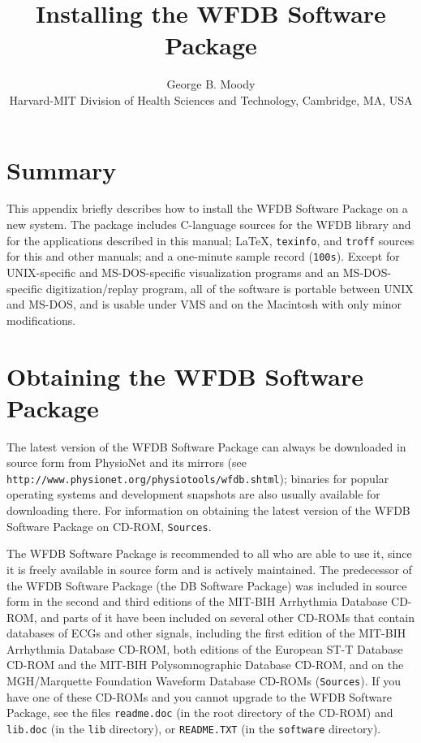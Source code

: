 \documentclass[twoside]{article}
\title{Installing the WFDB Software Package}
\author{George B. Moody\\
Harvard-MIT Division of Health Sciences and Technology, Cambridge, MA, USA}
\date{}
\begin{document}
\setcounter{page}{109}

\maketitle

\section*{Summary}
This appendix briefly describes how to install the WFDB Software Package on a
new system.  The package includes C-language sources for the WFDB library and
for the applications described in this manual; \LaTeX{}, {\tt texinfo}, and
{\tt troff} sources for this and other manuals; and a one-minute sample record
({\tt 100s}).  Except for UNIX-specific and MS-DOS-specific visualization
programs and an MS-DOS-specific digitization/replay program, all of the
software is portable between UNIX and MS-DOS, and is usable under VMS and on
the Macintosh with only minor modifications.

\section*{Obtaining the WFDB Software Package}
The latest version of the WFDB Software Package can always be downloaded in
source form from PhysioNet and its mirrors (see
{\tt http://www.physio\-net.org/physio\-tools/wfdb.shtml}); binaries for
popular operating systems and development snapshots are also usually available
for downloading there.  For information on obtaining the latest version of the
WFDB Software Package on CD-ROM, {\tt Sources}.

The WFDB Software Package is recommended to all who are able to use it, since
it is freely available in source form and is actively maintained.  The
predecessor of the WFDB Software Package (the DB Software Package) was included
in source form in the second and third editions of the MIT-BIH Arrhythmia
Database CD-ROM, and parts of it have been included on several other CD-ROMs
that contain databases of ECGs and other signals, including the first edition
of the MIT-BIH Arrhythmia Database CD-ROM, both editions of the European ST-T
Database CD-ROM and the MIT-BIH Polysomnographic Database CD-ROM, and on the
MGH/Marquette Foundation Waveform Database CD-ROMs ({\tt Sources}).  If you
have one of these CD-ROMs and you cannot upgrade to the WFDB Software Package,
see the files {\tt readme.doc} (in the root directory of the CD-ROM) and
{\tt lib.doc} (in the {\tt lib} directory), or {\tt README.TXT} (in the
{\tt software} directory).
\end{document}
